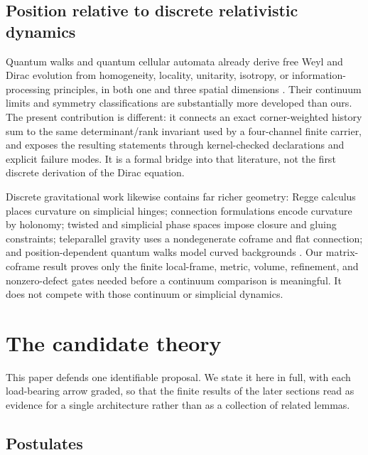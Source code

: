 \documentclass[11pt]{article}
\begin{document}
\subsection*{Position relative to discrete relativistic dynamics}

Quantum walks and quantum cellular automata already derive free Weyl and Dirac
evolution from homogeneity, locality, unitarity, isotropy, or information-
processing principles, in both one and three spatial dimensions
\cite{DarianoPerinottiPrinciples,BisioDarianoTosini,DarianoPathIntegral,
DarianoWeyl,MlodinowBrun}.  Their continuum limits and symmetry classifications
are substantially more developed than ours.  The present contribution is
different: it connects an exact corner-weighted history sum to the same
determinant/rank invariant used by a four-channel finite carrier, and exposes
the resulting statements through kernel-checked declarations and explicit
failure modes.  It is a formal bridge into that literature, not the first
discrete derivation of the Dirac equation.

Discrete gravitational work likewise contains far richer geometry: Regge
calculus places curvature on simplicial hinges; connection formulations encode
curvature by holonomy; twisted and simplicial phase spaces impose closure and
gluing constraints; teleparallel gravity uses a nondegenerate coframe and flat
connection; and position-dependent quantum walks model curved backgrounds
\cite{Regge,DittrichRyan,FreidelSpeziale,BaezWise,ArrighiCurvedWalk}.  Our
matrix-coframe result proves only the finite local-frame, metric, volume,
refinement, and nonzero-defect gates needed before a continuum comparison is
meaningful.  It does not compete with those continuum or simplicial dynamics.

\section{The candidate theory}
\label{sec:theory}

This paper defends one identifiable proposal.  We state it here in full, with
each load-bearing arrow graded, so that the finite results of the later
sections read as evidence for a single architecture rather than as a
collection of related lemmas.

\subsection{Postulates}
\end{document}
